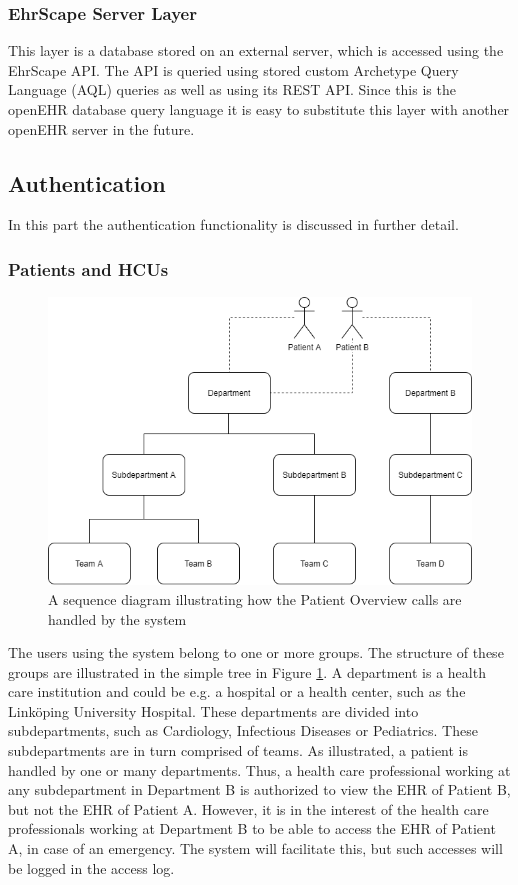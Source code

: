 \documentclass{article}
\begin{document}
\subsubsection{EhrScape Server Layer}
This layer is a database stored on an external server, which is accessed using the EhrScape API. The API is queried using stored custom Archetype Query Language (AQL) queries as well as using its REST API. Since this is the openEHR database query language it is easy to substitute this layer with another openEHR server in the future.

\clearpage
\subsection{Authentication} \label{Authentication}
In this part the authentication functionality is discussed in further detail.

\subsubsection{Patients and HCUs}
\begin{figure}[h]
    \centering
    \includegraphics[scale = 0.45]{departments}
    \caption{A sequence diagram illustrating how the Patient Overview calls are handled by the system}
    \label{fig:departments}
\end{figure}

The users using the system belong to one or more groups. The structure of these groups are illustrated in the simple tree in Figure \ref{fig:departments}. A department is a health care institution and could be e.g. a hospital or a health center, such as the Linköping University Hospital. These departments are divided into subdepartments, such as Cardiology,  Infectious Diseases or Pediatrics. These subdepartments are in turn comprised of teams.  
As illustrated, a patient is handled by one or many departments. Thus, a health care professional working at any subdepartment in Department B is authorized to view the EHR of Patient B, but not the EHR of Patient A.
However, it is in the interest of the health care professionals working at Department B to be able to access the EHR of Patient A, in case of an emergency. The system will facilitate this, but such accesses will be logged in the access log.
\end{document}
